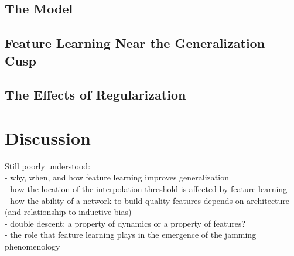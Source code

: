 \documentclass[a4paper, 12pt]{article}
\begin{document}
\subsection{The Model}
\subsection{Feature Learning Near the Generalization Cusp}
\subsection{The Effects of Regularization}

\section{Discussion}

Still poorly understood:\\
- why, when, and how feature learning improves generalization\\
- how the location of the interpolation threshold is affected by feature learning\\
- how the ability of a network to build quality features depends on architecture (and relationship to inductive bias) \\
- double descent: a property of dynamics or a property of features?\\
- the role that feature learning plays in the emergence of the jamming phenomenology\\

\printbibliography
\end{document}
